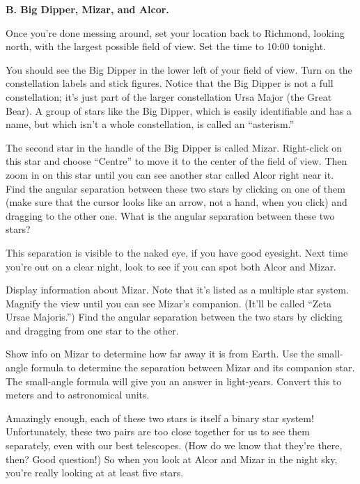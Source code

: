 \bigskip

{\bf B. Big Dipper, Mizar, and Alcor.}

Once you're done messing around, set your location back to Richmond,
looking north, with the largest possible field of view.  Set the
time to 10:00 tonight.

You should see the Big Dipper in the lower left of your field of view.  Turn
on the constellation labels and stick figures.  Notice that the Big
Dipper is not a full constellation; it's just part of the larger constellation
Ursa Major (the Great Bear).  A group of stars like the Big
Dipper, which is easily
identifiable and has a name, but which isn't a whole constellation,
is called an ``asterism.''  

The second star in the handle of the Big Dipper is called Mizar.
Right-click on this star and choose ``Centre'' to move it to the center
of the field of view.  Then zoom in on this star until you can see
another star called Alcor right near it.  Find the angular separation
between these two stars by clicking on one of them (make sure that the
cursor looks like an arrow, not a hand, when you click) and dragging
to the other one.  What is the angular separation between
these two stars?

\vskip 1in

This separation is visible to the naked eye, if you have good eyesight.
Next time you're out on a clear night, look to see if you can spot both
Alcor and Mizar.

Display information about Mizar.  Note that it's listed as a 
multiple star system.  Magnify the view until you can see
Mizar's companion.  (It'll be called ``Zeta Ursae Majoris.'')
Find the angular separation between the two
stars by clicking and dragging from one star to the other.

\vskip 1in

Show info on Mizar to determine how far away it is from Earth.
Use the small-angle formula to determine the separation between
Mizar and its companion star.  The small-angle formula will give you
an answer in light-years.  Convert this to meters and to astronomical
units.

\vskip 2in

Amazingly enough, each of these two stars is itself a binary star system!
Unfortunately, these two pairs are too close together for us to 
see them separately, even with our best telescopes.  (How do we know
that they're there, then?  Good question!)  So when you look at Alcor and
Mizar in the night sky, you're really looking at at least five stars.
 
